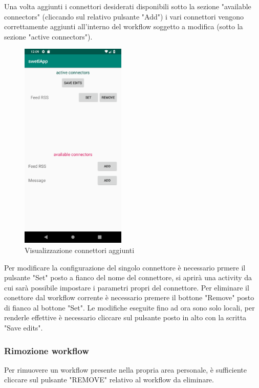 Una volta aggiunti i connettori desiderati disponibili sotto la sezione "available connectors" (cliccando sul relativo pulsante "Add") i vari connettori vengono correttamente aggiunti all'interno del workflow soggetto a modifica (sotto la sezione "active connectors").
\begin{figure}[H]
	\centering
	\includegraphics[width=5cm]{../includes/pics/example_connector_added_to_workflow.png}
	\caption{\label{fig:example_connector_added_to_workflow}Visualizzazione connettori aggiunti}
\end{figure}
Per modificare la configurazione del singolo connettore è necessario prmere il pulsante "Set" posto a fianco del nome del connettore, si aprirà una activity da cui sarà possibile impostare i parametri propri del connettore.
Per eliminare il conettore dal workflow corrente è necessario premere il bottone "Remove" posto di fianco al bottone "Set".
Le modifiche eseguite fino ad ora sono solo locali, per renderle effettive è necessario cliccare sul pulsante posto in alto con la scritta "Save edits".
\subsubsection{Rimozione workflow}
\label{sec:sec_rimozione_workflow}
Per rimuovere un workflow presente nella propria area personale, è sufficiente cliccare sul pulsante "REMOVE" relativo al workflow da eliminare.